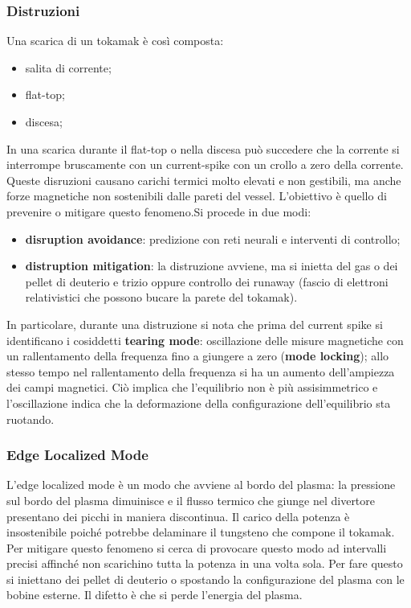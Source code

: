 \documentclass{article}
\begin{document}
\subsubsection{Distruzioni}
Una scarica di un tokamak è così composta:\begin{itemize}
	\item salita di corrente;
	\item flat-top;
	\item discesa;
\end{itemize}
In una scarica durante il flat-top o nella discesa può succedere che la corrente si interrompe bruscamente con un current-spike con un crollo a zero della corrente. Queste disruzioni causano carichi termici molto elevati e non gestibili, ma anche forze magnetiche non sostenibili dalle pareti del vessel. L'obiettivo è quello di prevenire o mitigare questo fenomeno.Si procede in due modi:\begin{itemize}
	\item \textbf{disruption avoidance}: predizione con reti neurali e interventi di controllo;
	\item \textbf{distruption mitigation}: la distruzione avviene, ma si inietta del gas o dei pellet di deuterio e trizio oppure controllo dei runaway (fascio di elettroni relativistici che possono bucare la parete del tokamak).
\end{itemize}
In particolare, durante una distruzione si nota che prima del current spike si identificano i cosiddetti \textbf{tearing mode}: oscillazione delle misure magnetiche con un rallentamento della frequenza fino a giungere a zero (\textbf{mode locking}); allo stesso tempo nel rallentamento della frequenza si ha un aumento dell'ampiezza dei campi magnetici. Ciò implica che l'equilibrio non è più assisimmetrico e l'oscillazione indica che la deformazione della configurazione dell'equilibrio sta ruotando.
\subsubsection{Edge Localized Mode}
L'edge localized mode è un modo che avviene al bordo del plasma: la pressione sul bordo del plasma dimuinisce e il flusso termico che giunge nel divertore presentano dei picchi in maniera discontinua. Il carico della potenza è insostenibile poiché potrebbe delaminare il tungsteno che compone il tokamak. Per mitigare questo fenomeno si cerca di provocare questo modo ad intervalli precisi affinché non scarichino tutta la potenza in una volta sola. Per fare questo si iniettano dei pellet di deuterio o spostando la configurazione del plasma con le bobine esterne. Il difetto è che si perde l'energia del plasma.
\end{document}
